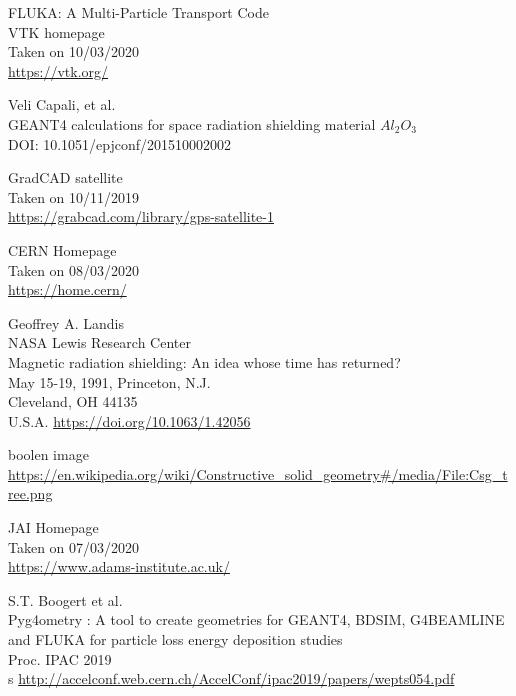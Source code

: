 \documentclass[12pt,a4paper]{article}
\begin{document}

\newpage
\newpage
\footnotesize

\begin{thebibliography}{1}

	
	FLUKA: A Multi-Particle Transport Code\\
	
	VTK homepage\\
	Taken on 10/03/2020\\
	\url{https://vtk.org/}

	Veli Capali, et al.\\
	GEANT4 calculations for space radiation shielding material $Al_2O_3$\\
	DOI: 10.1051/epjconf/201510002002

	GradCAD satellite\\
	Taken on 10/11/2019\\	
	\url{https://grabcad.com/library/gps-satellite-1}

	CERN Homepage\\
	Taken on 08/03/2020\\
	\url{https://home.cern/}
	
	Geoffrey A. Landis\\
	NASA Lewis Research Center\\
	Magnetic radiation shielding: An idea whose time has returned?\\
	May 15-19, 1991, Princeton, N.J.\\
	Cleveland, OH 44135\\
	U.S.A.
	\url{https://doi.org/10.1063/1.42056}
	
	boolen image\\
	\url{https://en.wikipedia.org/wiki/Constructive_solid_geometry#/media/File:Csg_tree.png}
	
	JAI Homepage\\
	Taken on 07/03/2020\\
	\url{https://www.adams-institute.ac.uk/}

	S.T. Boogert et al.\\
	Pyg4ometry : A tool to create geometries for GEANT4, BDSIM, G4BEAMLINE and FLUKA for particle loss energy deposition studies\\
	Proc. IPAC 2019\\s
	\url{http://accelconf.web.cern.ch/AccelConf/ipac2019/papers/wepts054.pdf}


\end{thebibliography}
\end{document}
